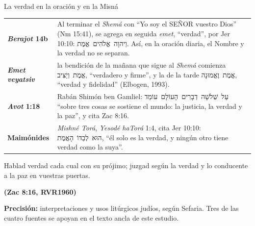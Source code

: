 \documentclass[hyperref={bookmarks=false},aspectratio=169]{beamer}
\newcommand{\heb}[1]{\mbox{\foreignlanguage{hebrew}{#1}}}
\newcommand{\SENOR}{S{\fontsize{0.78em}{1em}\selectfont EÑOR}}
\newcommand{\fuente}[1]{\par\hfill{\upshape\bfseries\footnotesize\textcolor{azul}{#1}}}
\newcommand{\precision}[1]{{\footnotesize\color{gris}\textbf{Precisión:} #1}}
\begin{document}
\begin{frame}{La verdad en la oración y en la Misná}
\scriptsize\renewcommand{\arraystretch}{1.2}
\begin{tabular}{@{}>{\RaggedRight\arraybackslash}p{2.6cm}>{\RaggedRight\arraybackslash}p{9.2cm}@{}}
\toprule
\textbf{\emph{Berajot} 14b} & Al terminar el \emph{Shemá} con ``Yo soy el \SENOR{} vuestro Dios'' (Nm 15:41), se agrega en seguida \emph{emet}, ``verdad'', por Jer 10:10: \heb{וַיהוָה אֱלֹהִים אֱמֶת}. Así, en la oración diaria, el Nombre y la verdad no se separan. \\
\textbf{\emph{Emet veyatsiv}} & la bendición de la mañana que sigue al \emph{Shemá} comienza \heb{אֱמֶת וְיַצִּיב}, ``verdadero y firme'', y la de la tarde \heb{אֱמֶת וֶאֱמוּנָה}, ``verdad y fidelidad'' (Elbogen, 1993). \\
\textbf{\emph{Avot} 1:18} & Rabán Shimón ben Gamliel: \heb{עַל שְׁלֹשָׁה דְבָרִים הָעוֹלָם עוֹמֵד} ``sobre tres cosas se sostiene el mundo: la justicia, la verdad y la paz'', y cita Zac 8:16. \\
\textbf{Maimónides} & \emph{Mishné Torá}, \emph{Yesodé haTorá} 1:4, cita Jer 10:10: \heb{הוּא לְבַדּוֹ הָאֱמֶת}, ``él solo es la verdad, y ningún otro tiene verdad como la suya''. \\
\bottomrule
\end{tabular}\par\medskip
\begin{cita}Hablad verdad cada cual con su prójimo; juzgad según la verdad y lo conducente a la paz en vuestras puertas.\fuente{(Zac 8:16, RVR1960)}\end{cita}
\precision{interpretaciones y usos litúrgicos judíos, según Sefaria. Tres de las cuatro fuentes se apoyan en el texto ancla de este estudio.}
\end{frame}
\end{document}
